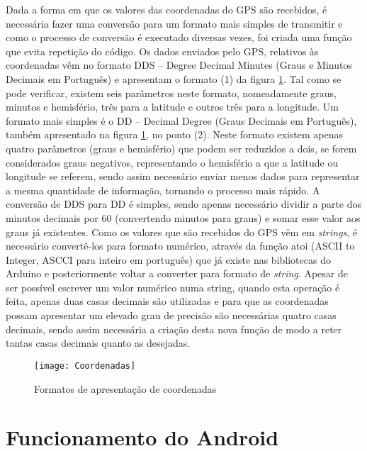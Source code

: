 Dada a forma em que os valores das coordenadas do GPS são recebidos, é necessária fazer uma conversão para um formato mais simples de transmitir e como o processo de conversão é executado diversas vezes, foi criada uma função que evita repetição do código.
Os dados enviados pelo GPS, relativos às coordenadas vêm no formato DDS – Degree Decimal Minutes (Graus e Minutos Decimais em Português) e apresentam o formato (1) da figura \ref{fig:formatos_de_apresentacao_de_coordenadas}.
Tal como se pode verificar, existem seis parâmetros neste formato, nomeadamente graus, minutos  e hemisfério, três para a latitude e outros três para a longitude. 
Um formato mais simples é o DD – Decimal Degree (Graus Decimais em Português), também apresentado na figura \ref{fig:formatos_de_apresentacao_de_coordenadas}, no ponto (2).
Neste formato existem apenas quatro parâmetros (graus e hemisfério) que podem ser reduzidos a dois, se forem considerados graus negativos, representando o hemisfério a que a latitude ou longitude se referem, sendo assim necessário enviar menos dados para representar a mesma quantidade de informação, tornando o processo mais rápido.
A conversão de DDS para DD é simples, sendo apenas necessário dividir a parte dos minutos decimais por 60 (convertendo minutos para graus) e somar esse valor aos graus já existentes.
Como os valores que são recebidos do GPS vêm em \emph{strings}, é necessário convertê-los para formato numérico, através da função atoi (ASCII to Integer, ASCCI para inteiro em português) que já existe nas bibliotecas do Arduino e posteriormente voltar a converter para formato de \emph{string}.
Apesar de ser possível escrever um valor numérico numa string, quando esta operação é feita, apenas duas casas decimais são utilizadas e para que as coordenadas possam apresentar um elevado grau de precisão são necessárias quatro casas decimais, sendo assim necessária a criação desta nova função de modo a reter tantas casas decimais quanto as desejadas.

\begin{figure}[!htbp]
	\centering
	\texttt{[image: Coordenadas]}
	\caption{Formatos de apresentação de coordenadas}
	\label{fig:formatos_de_apresentacao_de_coordenadas}
\end{figure}

\section{Funcionamento do Android}
\label{sec:funcionamento_do_android}

